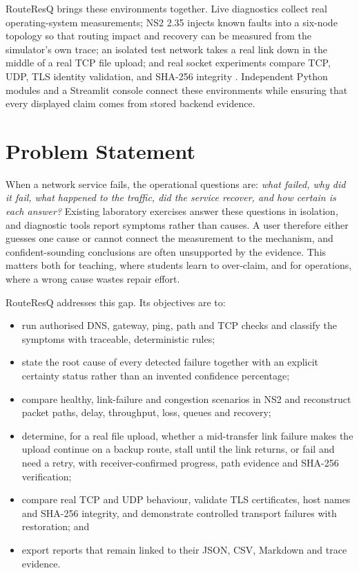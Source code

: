 \documentclass[12pt,a4paper]{report}
\numberwithin{equation}{chapter}
\begin{document}
RouteResQ brings these environments together. Live diagnostics collect real operating-system measurements; NS2 2.35 injects known faults into a six-node topology so that routing impact and recovery can be measured from the simulator's own trace; an isolated test network takes a real link down in the middle of a real TCP file upload; and real socket experiments compare TCP, UDP, TLS identity validation, and SHA-256 integrity \cite{sha}. Independent Python modules and a Streamlit console \cite{streamlit} connect these environments while ensuring that every displayed claim comes from stored backend evidence.

\section{Problem Statement}
When a network service fails, the operational questions are: \emph{what failed, why did it fail, what happened to the traffic, did the service recover, and how certain is each answer?} Existing laboratory exercises answer these questions in isolation, and diagnostic tools report symptoms rather than causes. A user therefore either guesses one cause or cannot connect the measurement to the mechanism, and confident-sounding conclusions are often unsupported by the evidence. This matters both for teaching, where students learn to over-claim, and for operations, where a wrong cause wastes repair effort.

RouteResQ addresses this gap. Its objectives are to:
\begin{itemize}
  \item run authorised DNS, gateway, ping, path and TCP checks and classify the symptoms with traceable, deterministic rules;
  \item state the root cause of every detected failure together with an explicit certainty status rather than an invented confidence percentage;
  \item compare healthy, link-failure and congestion scenarios in NS2 and reconstruct packet paths, delay, throughput, loss, queues and recovery;
  \item determine, for a real file upload, whether a mid-transfer link failure makes the upload continue on a backup route, stall until the link returns, or fail and need a retry, with receiver-confirmed progress, path evidence and SHA-256 verification;
  \item compare real TCP and UDP behaviour, validate TLS certificates, host names and SHA-256 integrity, and demonstrate controlled transport failures with restoration; and
  \item export reports that remain linked to their JSON, CSV, Markdown and trace evidence.
\end{itemize}
\end{document}
